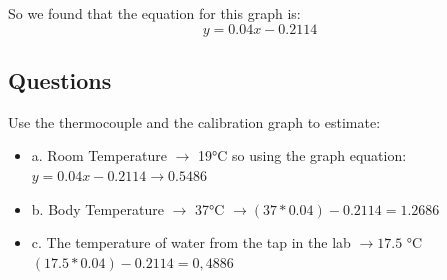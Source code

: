 \documentclass[a4paper]{article}
\begin{document}
        So we found that the equation for this graph is:
        \[y = 0.04x - 0.2114\]

\subsection{Questions}

Use the thermocouple and the calibration graph to estimate:

\begin{itemize}
    \item a. Room Temperature $\rightarrow$ 19°C so using the graph equation:  $y = 0.04x - 0.2114 \rightarrow 0.5486$ 
    \item b. Body Temperature $\rightarrow$ 37°C $\rightarrow (37 * 0.04) - 0.2114 = 1.2686$
    \item c. The temperature of water from the tap in the lab $\rightarrow 17.5$ °C $(17.5 * 0.04) - 0.2114 = 0,4886 $ 
\end{itemize}
    
\end{document}
